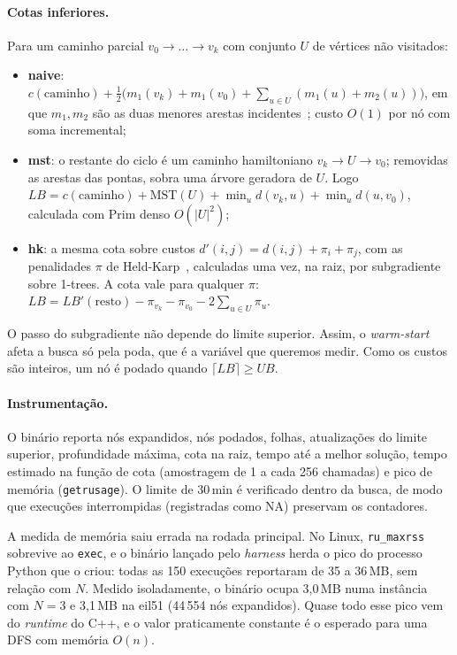 \documentclass[12pt]{article}
\begin{document}
\paragraph{Cotas inferiores.} Para um caminho parcial $v_0 \to \dots \to v_k$ com
conjunto $U$ de vértices não visitados:
\begin{itemize}
  \item \textbf{naive}: $c(\text{caminho}) + \frac{1}{2}\big(m_1(v_k) + m_1(v_0) +
        \sum_{u \in U} (m_1(u) + m_2(u))\big)$, em que $m_1, m_2$ são as duas menores
        arestas incidentes~\cite{levitin2012}; custo $O(1)$ por nó com soma incremental;
  \item \textbf{mst}: o restante do ciclo é um caminho hamiltoniano $v_k \to U \to v_0$;
        removidas as arestas das pontas, sobra uma árvore geradora de $U$. Logo
        $LB = c(\text{caminho}) + \text{MST}(U) + \min_{u} d(v_k,u) + \min_{u} d(u,v_0)$,
        calculada com Prim denso $O(|U|^2)$;
  \item \textbf{hk}: a mesma cota sobre custos $d'(i,j) = d(i,j) + \pi_i + \pi_j$, com
        as penalidades $\pi$ de Held-Karp~\cite{heldkarp1970,heldkarp1971}, calculadas
        uma vez, na raiz, por subgradiente sobre 1-trees. A cota vale para
        qualquer $\pi$:
        $LB = LB'(\text{resto}) - \pi_{v_k} - \pi_{v_0} - 2\sum_{u\in U}\pi_u$.
\end{itemize}
O passo do subgradiente não depende do limite superior. Assim, o \textit{warm-start}
afeta a busca só pela poda, que é a variável que queremos medir. Como os custos são
inteiros, um nó é podado quando $\lceil LB \rceil \ge UB$.

\paragraph{Instrumentação.} O binário reporta nós expandidos, nós podados, folhas,
atualizações do limite superior, profundidade máxima, cota na raiz, tempo até a melhor
solução, tempo estimado na função de cota (amostragem de 1 a cada 256 chamadas) e pico
de memória (\texttt{getrusage}). O limite de 30\,min é verificado dentro da busca, de
modo que execuções interrompidas (registradas como NA) preservam os contadores.

A medida de memória saiu errada na rodada principal. No Linux, \texttt{ru\_maxrss}
sobrevive ao \texttt{exec}, e o binário lançado pelo \textit{harness} herda o pico do
processo Python que o criou: todas as 150 execuções reportaram de 35 a 36\,MB, sem
relação com $N$. Medido isoladamente, o binário ocupa 3,0\,MB numa instância com $N=3$
e 3,1\,MB na eil51 (44\,554 nós expandidos). Quase todo esse pico vem do
\textit{runtime} do C++, e o valor praticamente constante é o esperado para uma DFS com
memória $O(n)$.
\end{document}
